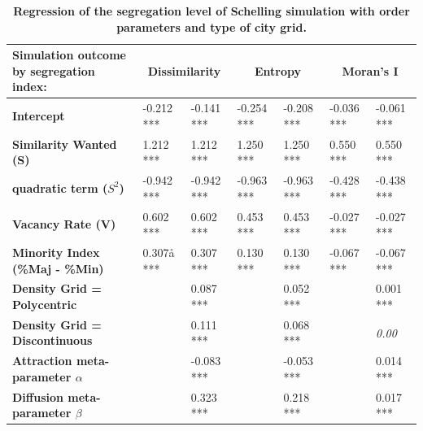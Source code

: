 \documentclass[preprint,5p,times,twocolumn,authoryear]{elsarticle}
\begin{document}
\begin{table}[]
\centering
\begin{threeparttable}
\caption{\textbf{Regression of the segregation level of Schelling simulation with order parameters and type of city grid.}}
\label{tab:regressionSchelling}
\begin{tabular}{|p{2.5cm}|ll|ll|ll|}
\hline
Simulation outcome by segregation index:    & \multicolumn{2}{c|}{\textbf{Dissimilarity}}   & \multicolumn{2}{c|}{\textbf{Entropy}} & \multicolumn{2}{c|}{\textbf{Moran's I}} \\ \hline
\textbf{Intercept}                          & -0.212 *** & -0.141 ***                       & -0.254 ***        & -0.208 ***        & -0.036 ***           & -0.061 ***               \\ \hline
\textbf{Similarity Wanted (S)}              & 1.212 ***  & 1.212 ***                        & 1.250 ***         & 1.250 ***         & 0.550 ***            & 0.550 ***                \\ 
\textbf{quadratic term ($S^2$)}               & -0.942 *** & -0.942 ***                       & -0.963 ***        & -0.963 ***        & -0.428 ***           & -0.438 ***               \\ 
\textbf{Vacancy Rate (V)}                   & 0.602 ***  & 0.602 ***                        & 0.453 ***         & 0.453 ***         & -0.027 ***           & -0.027 ***               \\ 
\textbf{Minority Index (\%Maj - \%Min)}     & 0.307å ***  & 0.307 ***                        & 0.130 ***         & 0.130 ***         & -0.067 ***           & -0.067 ***               \\ \hline
\textbf{Density Grid = Polycentric}         &            & 0.087 ***                        &                   & 0.052 ***         &                      & 0.001 ***                \\ 
\textbf{Density Grid = Discontinuous}       &            & 0.111 ***                        &                   & 0.068 ***         &                      & \textit{0.00}              \\
\textbf{Attraction meta-parameter $\alpha$} &            & -0.083 ***                       &                   & -0.053 ***        &                      & 0.014 ***                \\ 
\textbf{Diffusion meta-parameter $\beta$}   &            & 0.323 ***                        &                   & 0.218 ***         &                      & 0.017 ***           \\ \hline

\end{tabular}
\end{threeparttable}
\end{table}
\end{document}
